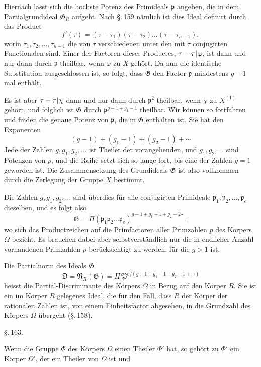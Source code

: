 Hiernach lässt sich die höchste Potenz des Primideals $\mathfrak{p}$ angeben, die in dem Partialgrundideal $\mathfrak{G}_R$ aufgeht. Nach \S.\,159 nämlich ist dies Ideal definirt durch das Product
\[ f'(\tau) = (\tau - \tau_1)(\tau - \tau_2)\ldots(\tau - \tau_{n-1}), \]
worin $\tau_1, \tau_2, \ldots, \tau_{n-1}$ die von $\tau$ verschiedenen unter den mit $\tau$ conjugirten Functionalen sind. Einer der Factoren dieses Productes, $\tau - \tau\mkern1mu|\mkern1mu\varphi$, ist dann und nur dann durch $\mathfrak{p}$ theilbar, wenn $\varphi$ zu $X$ gehört. Da nun die identische Substitution ausgeschlossen ist, so folgt, dass $\mathfrak{G}$ den Factor $\mathfrak{p}$ mindestens $g-1$ mal enthält.

Es ist aber $\tau - \tau\mkern1mu|\mkern1mu\chi$ dann und nur dann durch $\mathfrak{p}^2$ theilbar, wenn $\chi$ zu $X^{(1)}$ gehört, und folglich ist $\mathfrak{G}$ durch $\mathfrak{p}^{g-1+g_1-1}$ theilbar. Wir können so fortfahren und finden die genaue Potenz von $\mathfrak{p}$, die in $\mathfrak{G}$ enthalten ist. Sie hat den Exponenten
\[ (g-1) + (g_1-1) + (g_2-1) + \cdots \]
Jede der Zahlen $g, g_1, g_2, \ldots$ ist Theiler der vorangehenden, und $g_1, g_2, \ldots$ sind Potenzen von $p$, und die Reihe setzt sich so lange fort, bis eine der Zahlen $g = 1$ geworden ist. Die Zusammensetzung des Grundideals $\mathfrak{G}$ ist also vollkommen durch die Zerlegung der Gruppe $X$ bestimmt.

Die Zahlen $g, g_1, g_2, \ldots$ sind überdies für alle conjugirten Primideale $\mathfrak{p}_1, \mathfrak{p}_2, \ldots, \mathfrak{p}_e$ dieselben, und es folgt also
\[ \mathfrak{G} = \Pi(\mathfrak{p}_1\mathfrak{p}_2\ldots\mathfrak{p}_e)^{g-1+g_1-1+g_2-2\cdots}, \] %
wo sich das Productzeichen auf die Primfactoren aller Primzahlen $p$ des Körpers $\Omega$ bezieht. Es brauchen dabei aber selbstverständlich nur die in endlicher Anzahl vorhandenen Primzahlen $p$ berücksichtigt zu werden, für die $g > 1$ ist.

Die Partialnorm des Ideals $\mathfrak{G}$
\[ \mathfrak{D} = \mathfrak{N}_R(\mathfrak{G}) = \Pi\, \mathfrak{P}^{ef(g-1+g_1-1+g_2-1+\cdots)} \]
heisst die Partial-Discriminante des Körpers $\Omega$ in Bezug auf den Körper $R$. Sie ist ein im Körper $R$ gelegenes Ideal, die für den Fall, dass $R$ der Körper der rationalen Zahlen ist, von einem Einheitsfactor abgesehen, in die Grundzahl des Körpers $\Omega$ übergeht (\S.\,158).

\begin{center}
\S.\,163.

\end{center}

Wenn die Gruppe $\Phi$ des Körpers $\Omega$ einen Theiler $\Phi'$ hat, so gehört zu $\Phi'$ ein Körper $\Omega'$, der ein Theiler von $\Omega$ ist und

